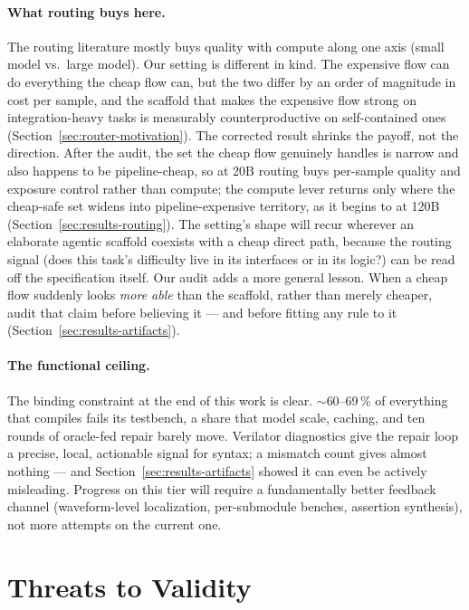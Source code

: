 \paragraph{What routing buys here.}
The routing literature mostly buys quality with compute along one axis
(small model vs.\ large model). Our setting is different in kind. The
expensive flow can do everything the cheap flow can, but the two
differ by an order of magnitude in cost per sample, and the scaffold
that makes the expensive flow strong on integration-heavy tasks is
measurably counterproductive on self-contained ones
(Section~\ref{sec:router-motivation}). The corrected result shrinks
the payoff, not the direction. After the audit, the set the cheap flow
genuinely handles is narrow and also happens to be pipeline-cheap, so
at 20B routing buys per-sample quality and exposure control rather
than compute; the compute lever returns only where the cheap-safe set
widens into pipeline-expensive territory, as it begins to at 120B
(Section~\ref{sec:results-routing}). The setting's shape will recur
wherever an elaborate agentic scaffold coexists with a cheap direct
path, because the routing signal (does this task's difficulty live in
its interfaces or in its logic?) can be read off the specification
itself. Our audit adds a more general lesson. When a cheap flow
suddenly looks \emph{more able} than the scaffold, rather than merely
cheaper, audit that claim before believing it --- and before fitting
any rule to it (Section~\ref{sec:results-artifacts}).

\paragraph{The functional ceiling.}
The binding constraint at the end of this work is clear.
${\sim}60$--69\,\% of everything that compiles fails its testbench, a
share that model scale, caching, and ten rounds of
oracle-fed repair barely move. Verilator diagnostics give the
repair loop a precise, local, actionable signal for syntax; a mismatch
count gives almost nothing --- and Section~\ref{sec:results-artifacts}
showed it can even be actively misleading. Progress on this tier will
require a fundamentally better feedback channel (waveform-level
localization, per-submodule benches, assertion synthesis), not more
attempts on the current one.

\section{Threats to Validity}
\label{sec:threats}

